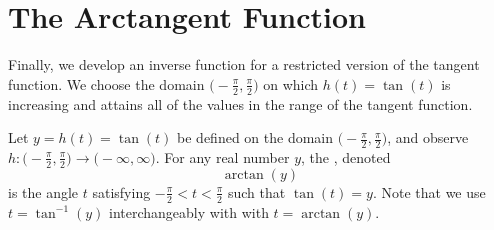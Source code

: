 \documentclass{ximera}
\begin{document}
\section{The Arctangent Function}
Finally, we develop an inverse function for a restricted version of the tangent function.  We choose the domain $\Big(\!-\frac{\pi}{2}, \frac{\pi}{2}\Big)$ on which $h(t) = \tan(t)$ is increasing and attains all of the values in the range of the tangent function.%
\begin{definition}
Let $y = h(t) = \tan(t)$ be defined on the domain $\Big(\!-\frac{\pi}{2}, \frac{\pi}{2}\Big)$, and observe $h : \Big(\!-\frac{\pi}{2}, \frac{\pi}{2}\Big) \to \big(-\infty,\infty\big)$.  For any real number $y$, the , denoted%
\begin{equation*}
\arctan(y)
\end{equation*}
is the angle $t$ satisfying $-\frac{\pi}{2} < t <  \frac{\pi}{2}$ such that $\tan(t) = y$.
%
Note that we use $t=\tan^{-1}(y)$ interchangeably with with $t = \arctan(y)$. 
\end{definition}
\end{document}
